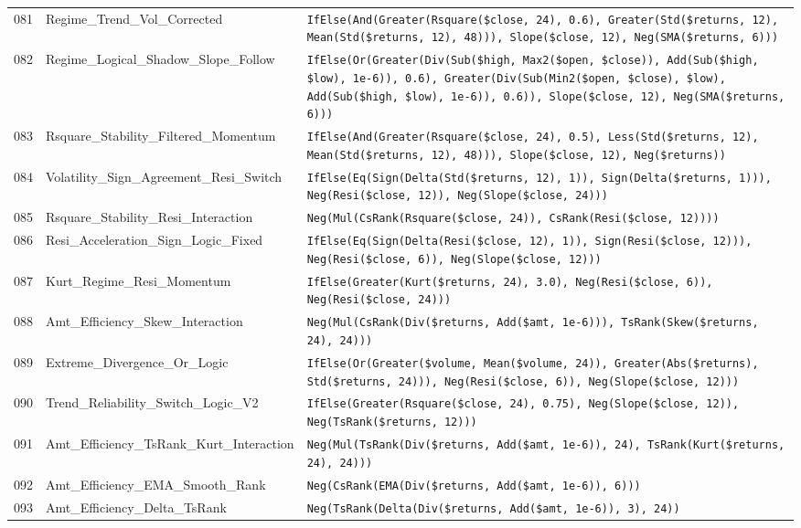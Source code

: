 \begin{longtable}{@{}llp{}@{}}
081 & Regime\_Trend\_Vol\_Corrected & \texttt{IfElse(And(Greater(Rsquare(\$close, 24), 0.6), Greater(Std(\$returns, 12), Mean(Std(\$returns, 12), 48))), Slope(\$close, 12), Neg(SMA(\$returns, 6)))} \\
082 & Regime\_Logical\_Shadow\_Slope\_Follow & \texttt{IfElse(Or(Greater(Div(Sub(\$high, Max2(\$open, \$close)), Add(Sub(\$high, \$low), 1e-6)), 0.6), Greater(Div(Sub(Min2(\$open, \$close), \$low), Add(Sub(\$high, \$low), 1e-6)), 0.6)), Slope(\$close, 12), Neg(SMA(\$returns, 6)))} \\
083 & Rsquare\_Stability\_Filtered\_Momentum & \texttt{IfElse(And(Greater(Rsquare(\$close, 24), 0.5), Less(Std(\$returns, 12), Mean(Std(\$returns, 12), 48))), Slope(\$close, 12), Neg(\$returns))} \\
084 & Volatility\_Sign\_Agreement\_Resi\_Switch & \texttt{IfElse(Eq(Sign(Delta(Std(\$returns, 12), 1)), Sign(Delta(\$returns, 1))), Neg(Resi(\$close, 12)), Neg(Slope(\$close, 24)))} \\
085 & Rsquare\_Stability\_Resi\_Interaction & \texttt{Neg(Mul(CsRank(Rsquare(\$close, 24)), CsRank(Resi(\$close, 12))))} \\
086 & Resi\_Acceleration\_Sign\_Logic\_Fixed & \texttt{IfElse(Eq(Sign(Delta(Resi(\$close, 12), 1)), Sign(Resi(\$close, 12))), Neg(Resi(\$close, 6)), Neg(Slope(\$close, 12)))} \\
087 & Kurt\_Regime\_Resi\_Momentum & \texttt{IfElse(Greater(Kurt(\$returns, 24), 3.0), Neg(Resi(\$close, 6)), Neg(Resi(\$close, 24)))} \\
088 & Amt\_Efficiency\_Skew\_Interaction & \texttt{Neg(Mul(CsRank(Div(\$returns, Add(\$amt, 1e-6))), TsRank(Skew(\$returns, 24), 24)))} \\
089 & Extreme\_Divergence\_Or\_Logic & \texttt{IfElse(Or(Greater(\$volume, Mean(\$volume, 24)), Greater(Abs(\$returns), Std(\$returns, 24))), Neg(Resi(\$close, 6)), Neg(Slope(\$close, 12)))} \\
090 & Trend\_Reliability\_Switch\_Logic\_V2 & \texttt{IfElse(Greater(Rsquare(\$close, 24), 0.75), Neg(Slope(\$close, 12)), Neg(TsRank(\$returns, 12)))} \\
091 & Amt\_Efficiency\_TsRank\_Kurt\_Interaction & \texttt{Neg(Mul(TsRank(Div(\$returns, Add(\$amt, 1e-6)), 24), TsRank(Kurt(\$returns, 24), 24)))} \\
092 & Amt\_Efficiency\_EMA\_Smooth\_Rank & \texttt{Neg(CsRank(EMA(Div(\$returns, Add(\$amt, 1e-6)), 6)))} \\
093 & Amt\_Efficiency\_Delta\_TsRank & \texttt{Neg(TsRank(Delta(Div(\$returns, Add(\$amt, 1e-6)), 3), 24))} \\

\end{longtable}
